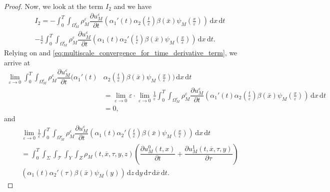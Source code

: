 \documentclass[10pt,a4paper]{amsart}
\def\T{\mathcal{T}}
\newcommand{\di}[1]{\,\mathrm{d}#1}
\def\dzdy{\di{z}\di{y}\di{\tau}\di{\overline{x}}\di{t}}
\def\es{\varepsilon}
\def\mint{\int_{0}^{T}\int_{\Sigma}\int_{\mathcal{T}}\int_{Y}\int_{Z}}
\def\omm{\Omega_M^\varepsilon}
\def\p{\partial}
\begin{document}
\begin{proof}
Now, we look at the term $I_2$ and we have 
\begin{multline*}
    I_2=- \int_0^T\int_{\omm}  {\rho_M^\es} \dfrac{\partial u_M^\es}{\partial t} ( \alpha_1'(t)\alpha_2(\frac{t}{\es})\beta(\bar x) \psi_M(\frac{x}{\es}))\di{x}\di{t}\\
    -\frac{1}{\es} \int_0^T\int_{\omm} {\rho_M^\es} \dfrac{\partial u_M^\es}{\partial t} ( \alpha_1(t)\alpha_2'(\frac{t}{\es})\beta(\bar x) \psi_M(\frac{x}{\es}))\di{x}\di{t}.
\end{multline*}
Relying on   and \eqref{eq:multiscale_convergence_for_time_derivative_term}, we arrive at
\begin{align*}
    \lim_{\es\rightarrow 0}\int_0^T\int_{\omm}  {\rho_M^\es} \dfrac{\partial u_M^\es}{\partial t} ( \alpha_1'(t)&\alpha_2(\frac{t}{\es})\beta(\bar x) \psi_M(\frac{x}{\es}))\di{x}\di{t}\\
    &=\lim_{\es\rightarrow 0}\es\cdot \lim_{\es\rightarrow 0} \frac 1\es \int_0^T\int_{\omm}  {\rho_M^\es} \dfrac{\partial u_M^\es}{\partial t} ( \alpha_1'(t)\alpha_2(\frac{t}{\es})\beta(\bar x) \psi_M(\frac{x}{\es}))\di{x}\di{t}\\
    &= 0,
\end{align*}
and
\begin{multline*}
    \lim_{\es\rightarrow 0}\frac{1}{\es} \int_0^T\int_{\omm} {\rho_M^\es} \dfrac{\partial u_M^\es}{\partial t} ( \alpha_1(t)\alpha_2'(\frac{t}{\es})\beta(\bar x) \psi_M(\frac{x}{\es}))\di{x}\di{t}\\
    = \mint  {\rho_M(t,\overline{x},\tau,y,z)} \left(\dfrac{\partial u_M^0(t,x)}{\partial t}+ \dfrac{\partial u_M^1(t,\overline{x},\tau,y)}{\partial \tau}\right) \\ ( \alpha_1(t)\alpha_2'(\tau)\beta(\bar x) \psi_M(y))\dzdy.
\end{multline*}

\end{proof}
\end{document}
